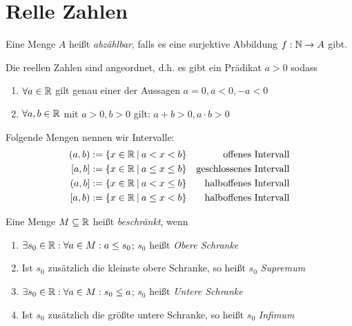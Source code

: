 \section{Relle Zahlen}

\begin{definition}
	Eine Menge $A$ heißt \emph{abzählbar}, falls es eine surjektive Abbildung $f : \mathbb{N} \rightarrow A$ gibt.
\end{definition}

\begin{definition}
	Die reellen Zahlen sind angeordnet, d.h. es gibt ein Prädikat $a > 0$ sodass
	\begin{enumerate}[noitemsep]
		\item $\forall a \in \mathbb{R}$ gilt genau einer der Aussagen $a = 0, a < 0, -a < 0$
		\item $\forall a,b \in \mathbb{R}$ mit $a > 0, b > 0$ gilt: $a + b > 0, a \cdot b > 0$
	\end{enumerate}
\end{definition}

\begin{definition}
	Folgende Mengen nennen wir Intervalle:
	\begin{align}
		(a,b) &:= \{ x \in \mathbb{R} \medspace | \medspace  a    < x    < b \} & \textnormal{offenes Intervall}       \\
		[a,b] &:= \{ x \in \mathbb{R} \medspace | \medspace  a \leq x \leq b \} & \textnormal{geschlossenes Intervall} \\
		(a,b] &:= \{ x \in \mathbb{R} \medspace | \medspace  a    < x \leq b \} & \textnormal{halboffenes Intervall}   \\
		[a,b) &:= \{ x \in \mathbb{R} \medspace | \medspace  a \leq x    < b \} & \textnormal{halboffenes Intervall}	
	\end{align}
\end{definition}

\begin{definition}
	Eine Menge $M \subseteq \mathbb{R}$ heißt \emph{beschränkt}, wenn
	\begin{enumerate}[noitemsep]
		\item $\exists s_0 \in \mathbb{R} : \forall a \in M : a \leq s_0$; $s_0$ heißt \emph{Obere Schranke}
		\item Ist $s_0$ zusätzlich die kleinste obere Schranke, so heißt $s_0$ \emph{Supremum}
		\item $\exists s_0 \in \mathbb{R} : \forall a \in M : s_0 \leq a$; $s_0$ heißt \emph{Untere Schranke}
		\item Ist $s_0$ zusätzlich die größte untere Schranke, so heißt $s_0$ \emph{Infimum}
	\end{enumerate}
\end{definition}


